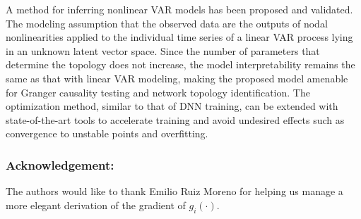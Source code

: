 \documentclass{llncs}
\begin{document}
A method for inferring nonlinear VAR models has been proposed and validated. The modeling assumption that the observed data are the outputs of nodal nonlinearities applied to the individual time series of a linear VAR process lying in an unknown latent vector space. Since the number of parameters that determine the topology does not increase, the model interpretability remains the same as that with linear VAR modeling, making the proposed model amenable for Granger causality testing and network topology identification. The optimization method, similar to that of DNN training, can be extended with state-of-the-art tools to accelerate training and avoid undesired effects such as convergence to unstable points and overfitting.

\subsubsection{Acknowledgement:}

The authors would like to thank Emilio Ruiz Moreno for helping us manage a more elegant derivation of the gradient of $g_i(\cdot)$.



\end{document}
